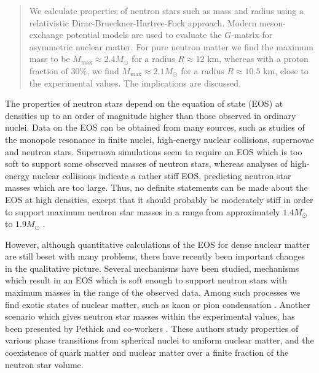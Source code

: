 \maketitle

\begin{abstract}
We calculate properties of neutron stars such as mass
and radius using a relativistic Dirac-Brueckner-Hartree-Fock
approach. Modern meson-exchange potential models are used to
evaluate the $G$-matrix for asymmetric nuclear matter. 
 For pure neutron matter we find the maximum mass to
be $M_{\mathrm{max}}\approx 2.4 M_{\odot}$ for a radius $R\approx 12$ km,
whereas with a proton fraction of $30\%$, we find
$M_{\mathrm{max}}\approx 2.1 M_{\odot}$ for a radius $R\approx 10.5$ km, close
to the experimental values.  The implications
are discussed. 
\end{abstract}


\clearpage

The properties of neutron stars depend on the equation of state (EOS)
at densities up to an order of magnitude higher than those observed
in ordinary nuclei.
Data on the EOS can be obtained from many sources, such as studies of
the monopole resonance in finite nuclei, high-energy
nuclear collisions, supernovae and neutron  stars.
Supernova simulations seem to require  an EOS which is too soft to
support some observed masses of neutron stars, whereas analyses of
high-energy nuclear collisions indicate a rather stiff EOS, predicting
neutron star masses which are too large.
Thus, no definite statements can be made
about the EOS at high densities, except that it
should probably be moderately stiff in order to
support maximum neutron star masses in a range
from approximately $1.4 M_{\odot}$ to $1.9 M_{\odot}$ \cite{thorsett93}.

However, although quantitative calculations of the EOS for dense
nuclear matter are still beset with many problems, there have recently
been important changes in the qualitative picture. Several mechanisms
have been studied, mechanisms which
result in an EOS which is soft enough to support
neutron stars with maximum masses in the range of the observed data.
Among such processes
we find exotic states of nuclear matter, such as
kaon 
\cite{kn87,brown93} or pion condensation
\cite{migdal78,migdal90,ps75,bp79,prog93}.
Another scenario which gives neutron star masses
within the experimental
values, has been presented by Pethick and co-workers
\cite{lrp93,hps93}. These authors study
properties of various phase transitions
from spherical nuclei to uniform nuclear matter, and the coexistence
of quark matter and nuclear matter over a finite fraction of the
neutron star volume. 

